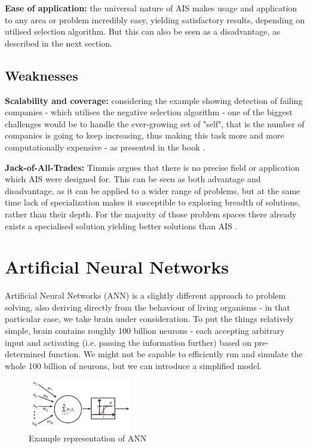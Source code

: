 \documentclass[letterpaper, 10 pt, conference]{ieeeconf}  %
\begin{document}
\textbf{Ease of application:} the universal nature of AIS makes usage and application to any area or problem incredibly easy, yielding satisfactory results, depending on utilised selection algorithm. But this can also be seen as a disadvantage, as described in the next section.

\subsection{Weaknesses}
\textbf{Scalability and coverage:} considering the example showing detection of failing companies - which utilises the negative selection algorithm - one of the biggest challenges would be to handle the ever-growing set of "self", that is the number of companies is going to keep increasing, thus making this task more and more computationally expensive - as presented in the book \cite{brabazon2006biologically}.

\textbf{Jack-of-All-Trades:} Timmis argues \cite{timmis2004overview} that there is no precise field or application which AIS were designed for. This can be seen as both advantage and disadvantage, as it can be applied to a wider range of problems, but at the same time lack of specialization makes it susceptible to exploring breadth of solutions, rather than their depth. For the majority of those problem spaces there already exists a specialised solution yielding better solutions than AIS \cite{garrett2005we}.

\section{Artificial Neural Networks}
Artificial Neural Networks (ANN) is a slightly different approach to problem solving, also deriving directly from the behaviour of living organisms - in that particular case, we take brain under consideration. To put the things relatively simple, brain contains roughly 100 billion neurons \cite{lent2012many} - each accepting arbitrary input and activating (i.e. passing the information further) based on pre-determined function. We might not be capable to efficiently run and simulate the whole 100 billion of neurons, but we can introduce a simplified model.

\begin{figure}[h!]
  \centering
  \includegraphics[width=0.4\textwidth]{ann}
  \caption{Example representation of ANN \cite{krogh2008artificial}}
  \label{fig:ann}
\end{figure}
\end{document}
